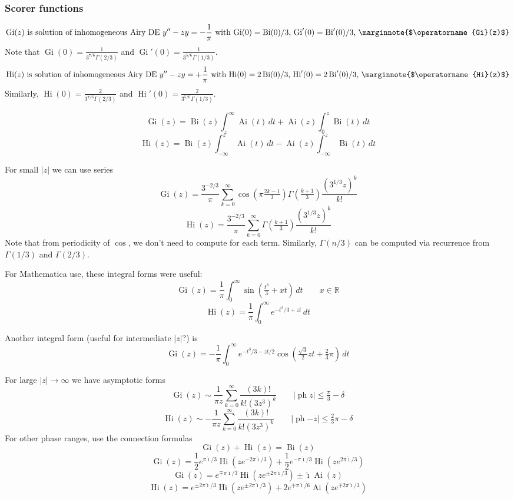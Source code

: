\documentclass[10pt,dvipdfmx,letterpaper,twoside]{article}
\let\O=\operatorname
\newcommand{\RR}{{\mathbb{R}}}
\newcommand{\ii}{{\hat{\imath}}}
\let\DEF=\marginnote
\let\Gam=\Gamma
\begin{document}
\subsubsection{Scorer functions}
\[ \O{Gi}(z) \text{\ is solution of inhomogeneous Airy DE $y''-z y = -\frac1\pi$ with $\O{Gi}(0)=\O{Bi}(0)/3$, $\O{Gi}'(0)=\O{Bi}'(0)/3$, }
  \DEF{$\O{Gi}(z)$} \]
Note that $\O{Gi}(0) = \frac{1}{3^{7/6}\Gam(2/3)}$ and $\O{Gi}'(0) = \frac{1}{3^{5/6}\Gam(1/3)}$.
\[ \O{Hi}(z) \text{\ is solution of inhomogeneous Airy DE $y''-z y = +\frac1\pi$ with $\O{Hi}(0)=2\O{Bi}(0)/3$, $\O{Hi}'(0)=2\O{Bi}'(0)/3$, }
  \DEF{$\O{Hi}(z)$} \]
Similarly, $\O{Hi}(0) = \frac{2}{3^{7/6}\Gam(2/3)}$ and $\O{Hi}'(0) = \frac{2}{3^{5/6}\Gam(1/3)}$.

\[ \O{Gi}(z) = \O{Bi}(z)\int_z^\infty\O{Ai}(t)\,dt + \O{Ai}(z)\int_0^z\O{Bi}(t)\,dt \]
\[ \O{Hi}(z) = \O{Bi}(z)\int_{-\infty}^z\O{Ai}(t)\,dt - \O{Ai}(z)\int_{-\infty}^z\O{Bi}(t)\,dt \]

For small $|z|$ we can use series
\[ \O{Gi}(z) = \frac{3^{-2/3}}{\pi}\sum_{k=0}^\infty \cos(\pi\tfrac{2k-1}{3})\Gam(\tfrac{k+1}{3})\frac{(3^{1/3} z)^k}{k!} \]
\[ \O{Hi}(z) = \frac{3^{-2/3}}{\pi}\sum_{k=0}^\infty                         \Gam(\tfrac{k+1}{3})\frac{(3^{1/3} z)^k}{k!} \]
Note that from periodicity of $\cos$, we don't need to compute for each term.
Similarly, $\Gam(n/3)$ can be computed via recurrence from $\Gam(1/3)$ and $\Gam(2/3)$.

For Mathematica use, these integral forms were useful:
\[ \O{Gi}(z) = \frac{1}{\pi}\int_0^\infty\sin(\tfrac{t^3}{3} + xt)\,dt \qquad x\in\RR \]
\[ \O{Hi}(z) = \frac{1}{\pi}\int_0^\infty e^{-t^3/3 + zt}\,dt \]

Another integral form (useful for intermediate $|z|$?) is
\[ \O{Gi}(z) = -\frac{1}{\pi}\int_0^\infty e^{-t^3/3 - zt/2}\cos(\tfrac{\sqrt3}{2}zt + \tfrac23\pi)\,dt \]

For large $|z|\to\infty$ we have asymptotic forms
\[ \O{Gi}(z) \sim \frac{1}{\pi z}\sum_{k=0}^\infty \frac{(3k)!}{k!(3z^3)^k} \qquad |\O{ph}z|\leq\tfrac\pi3 - \delta \]
\[ \O{Hi}(z) \sim -\frac{1}{\pi z}\sum_{k=0}^\infty \frac{(3k)!}{k!(3z^3)^k} \qquad |\O{ph} {-z}|\leq\tfrac23\pi - \delta \]
For other phase ranges, use the connection formulas
\[ \O{Gi}(z) + \O{Hi}(z) = \O{Bi}(z) \]
\[ \O{Gi}(z) = \frac12 e^{\pi\ii/3}\O{Hi}(z e^{-2\pi\ii/3}) + \frac12 e^{-\pi\ii/3}\O{Hi}(z e^{2\pi\ii/3}) \]
\[ \O{Gi}(z) = e^{\mp\pi\ii/3}\O{Hi}(z e^{\pm2\pi\ii/3}) \pm \ii \O{Ai}(z) \]
\[ \O{Hi}(z) = e^{\pm2\pi\ii/3}\O{Hi}(z e^{\pm2\pi\ii/3}) + 2 e^{\mp\pi\ii/6}\O{Ai}(z e^{\mp2\pi\ii/3}) \]
\end{document}
